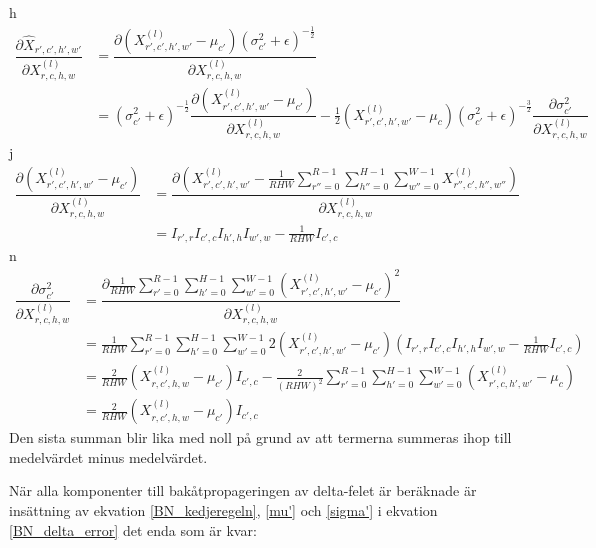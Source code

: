 \documentclass[a4paper,11pt,twoside]{article}
\newcommand*{\pd}[2]{\ensuremath{\dfrac{\partial #1}{\partial #2}}}
\begin{document}
h
\begin{align}\label{BN_kedjeregeln}
\pd{\hat{X}_{r',c',h',w'}}{{X}^{(l)}_{r,c,h,w}} 
	& = \pd{(X^{(l)}_{r',c',h',w'} - \mu_{c'}){(\sigma^2_{c'} + \epsilon)}^{-\frac{1}{2}}}{{X}^{(l)}_{r,c,h,w}} \\
	& = {(\sigma^2_{c'} + \epsilon)}^{-\frac{1}{2}} \pd{(X^{(l)}_{r',c',h',w'} - \mu_{c'})}{{X}^{(l)}_{r,c,h,w}} - \frac{1}{2}(X^{(l)}_{r',c',h',w'} - \mu_c){(\sigma^2_{c'} + \epsilon)}^{-\frac{3}{2}} \pd{\sigma^2_{c'}}{{X}^{(l)}_{r,c,h,w}}
\end{align}
j
\begin{equation}\label{mu'}
\begin{split}
\pd{(X^{(l)}_{r',c',h',w'} - \mu_{c'})}{{X}^{(l)}_{r,c,h,w}}
	& = \pd{({X^{(l)}_{r',c',h',w'} - \frac{1}{RHW} \sum\limits^{R-1}_{r''=0} \sum\limits^{H-1}_{h''=0} \sum\limits^{W-1}_{w''=0} X^{(l)}_{r'',c',h'',w''}})}{{X}^{(l)}_{r,c,h,w}} \\
	& = I_{r',r} I_{c',c} I_{h',h} I_{w',w} - \frac{1}{RHW} I_{c',c}
\end{split}
\end{equation}
n
\begin{equation}\label{sigma'}
\begin{split}
\pd{\sigma^2_{c'}}{{X}^{(l)}_{r,c,h,w}}
	& = \pd{\frac{1}{RHW} \sum\limits^{R-1}_{r'=0} \sum\limits^{H-1}_{h'=0} \sum\limits^{W-1}_{w'=0} ({X^{(l)}_{r',c',h',w'} - \mu_{c'}})^2}{{X}^{(l)}_{r,c,h,w}} \\
	& = \frac{1}{RHW} \sum\limits^{R-1}_{r'=0} \sum\limits^{H-1}_{h'=0} \sum\limits^{W-1}_{w'=0} 2 ({X^{(l)}_{r',c',h',w'} - \mu_{c'}}) (I_{r',r} I_{c',c} I_{h',h} I_{w',w} - \frac{1}{RHW} I_{c',c}) \\
	& = \frac{2}{RHW} ({X^{(l)}_{r,c',h,w} - \mu_{c'}})I_{c',c} - \frac{2}{(RHW)^2}  \sum\limits^{R-1}_{r'=0} \sum\limits^{H-1}_{h'=0} \sum\limits^{W-1}_{w'=0} ({X^{(l)}_{r',c,h',w'} - \mu_{c}}) \\
	& = \frac{2}{RHW} ({X^{(l)}_{r,c',h,w} - \mu_{c'}})I_{c',c}
\end{split}
\end{equation}
Den sista summan blir lika med noll på grund av att termerna summeras ihop till medelvärdet minus medelvärdet.

När alla komponenter till bakåtpropageringen av delta-felet är beräknade är insättning av ekvation \eqref{BN_kedjeregeln}, \eqref{mu'} och \eqref{sigma'} i ekvation \eqref{BN_delta_error} det enda som är kvar:
\end{document}
